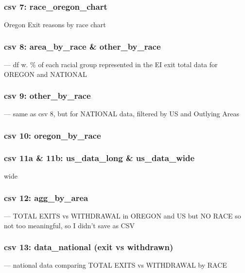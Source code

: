 \documentclass[
  letterpaper,
  DIV=11,
  numbers=noendperiod]{scrartcl}
\begin{document}
\subsubsection{csv 7:
race\_oregon\_chart}\label{csv-7-race_oregon_chart}

Oregon Exit reasons by race chart

\subsubsection{csv 8: area\_by\_race \&
other\_by\_race}\label{csv-8-area_by_race-other_by_race}

--- df w. \% of each racial group represented in the EI exit total data
for OREGON and NATIONAL

\subsubsection{csv 9: other\_by\_race}\label{csv-9-other_by_race}

--- same as csv 8, but for NATIONAL data, filtered by US and Outlying
Areas

\subsubsection{csv 10: oregon\_by\_race}\label{csv-10-oregon_by_race}

\subsubsection{csv 11a \& 11b: us\_data\_long \&
us\_data\_wide}\label{csv-11a-11b-us_data_long-us_data_wide}

wide

\subsubsection{csv 12: agg\_by\_area}\label{csv-12-agg_by_area}

--- TOTAL EXITS vs WITHDRAWAL in OREGON and US but NO RACE so not too
meaningful, so I didn't save as CSV

\subsubsection{csv 13: data\_national (exit vs
withdrawn)}\label{csv-13-data_national-exit-vs-withdrawn}

--- national data comparing TOTAL EXITS vs WITHDRAWAL by RACE
\end{document}
